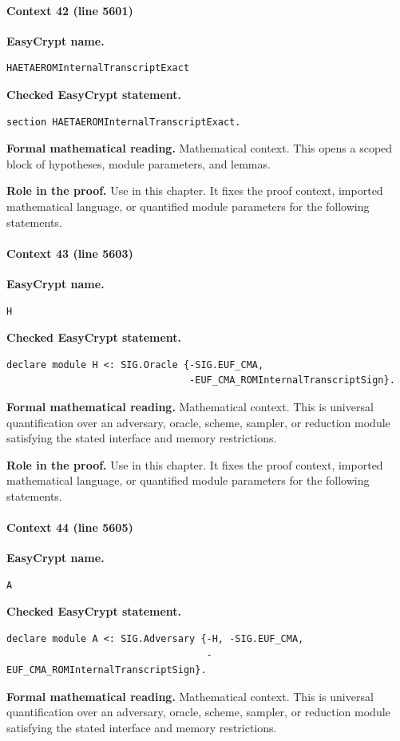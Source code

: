 \paragraph{Context 42 (line 5601)}
\noindent\textbf{EasyCrypt name.}
\begin{lstlisting}[language=EasyCrypt,basicstyle=\ttfamily\scriptsize]
HAETAEROMInternalTranscriptExact
\end{lstlisting}
\noindent\textbf{Checked EasyCrypt statement.}
\begin{lstlisting}[language=EasyCrypt,basicstyle=\ttfamily\scriptsize]
section HAETAEROMInternalTranscriptExact.
\end{lstlisting}
\noindent\textbf{Formal mathematical reading.}
Mathematical context. This opens a scoped block of hypotheses, module parameters, and lemmas.

\noindent\textbf{Role in the proof.}
Use in this chapter. It fixes the proof context, imported mathematical language, or quantified module parameters for the following statements.

\paragraph{Context 43 (line 5603)}
\noindent\textbf{EasyCrypt name.}
\begin{lstlisting}[language=EasyCrypt,basicstyle=\ttfamily\scriptsize]
H
\end{lstlisting}
\noindent\textbf{Checked EasyCrypt statement.}
\begin{lstlisting}[language=EasyCrypt,basicstyle=\ttfamily\scriptsize]
declare module H <: SIG.Oracle {-SIG.EUF_CMA,
                                -EUF_CMA_ROMInternalTranscriptSign}.
\end{lstlisting}
\noindent\textbf{Formal mathematical reading.}
Mathematical context. This is universal quantification over an adversary, oracle, scheme, sampler, or reduction module satisfying the stated interface and memory restrictions.

\noindent\textbf{Role in the proof.}
Use in this chapter. It fixes the proof context, imported mathematical language, or quantified module parameters for the following statements.

\paragraph{Context 44 (line 5605)}
\noindent\textbf{EasyCrypt name.}
\begin{lstlisting}[language=EasyCrypt,basicstyle=\ttfamily\scriptsize]
A
\end{lstlisting}
\noindent\textbf{Checked EasyCrypt statement.}
\begin{lstlisting}[language=EasyCrypt,basicstyle=\ttfamily\scriptsize]
declare module A <: SIG.Adversary {-H, -SIG.EUF_CMA,
                                   -EUF_CMA_ROMInternalTranscriptSign}.
\end{lstlisting}
\noindent\textbf{Formal mathematical reading.}
Mathematical context. This is universal quantification over an adversary, oracle, scheme, sampler, or reduction module satisfying the stated interface and memory restrictions.

